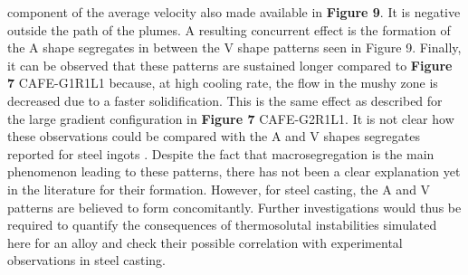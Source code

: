 component of the average velocity also made available in \textbf{Figure 9}. It is negative outside the path of the plumes. A resulting 
concurrent effect is the formation of the A shape segregates in between the V shape patterns seen in Figure 9. Finally, it can 
be observed that these patterns are sustained longer compared to \textbf{Figure 7} CAFE-G1R1L1 because, at high cooling rate, 
the flow in the mushy zone is decreased due to a faster solidification. This is the same effect as described for the large gradient 
configuration in \textbf{Figure 7} CAFE-G2R1L1.
It is not clear how these observations could be compared with the A  and V  shapes segregates reported for steel ingots 
\citep{pickering_macrosegregation_2013}. Despite the fact that macrosegregation is the main phenomenon leading to these 
patterns, there has not been a clear explanation yet in the literature for their formation. However, for steel casting, 
the A and V patterns are believed to form concomitantly. Further investigations would thus be required to quantify the 
consequences of thermosolutal instabilities simulated here for an  alloy and check their possible correlation 
with experimental observations in steel casting.
%
